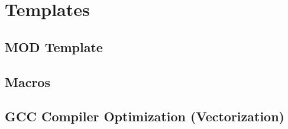 \section{Templates}
	\subsection{MOD Template}
		\begin{center}
		\end{center}

  \subsection{Macros}

  \subsection{GCC Compiler Optimization (Vectorization)}
